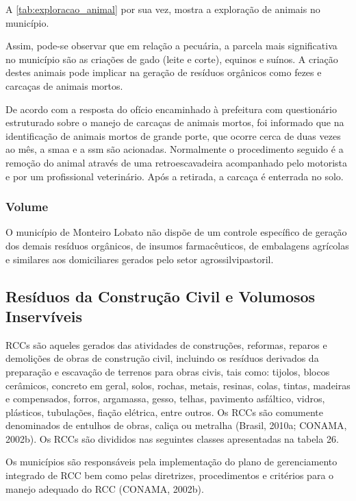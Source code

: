 	A \autoref{tab:exploracao_animal} por sua vez, mostra a exploração de animais no município.
	
	
	
	Assim, pode-se observar que em relação a pecuária, a parcela mais significativa no município são as criações de gado (leite e corte), equinos e suínos. A criação destes animais pode implicar na geração de resíduos orgânicos como fezes e carcaças de animais mortos.
	
	De acordo com a resposta do ofício encaminhado à prefeitura com questionário estruturado sobre o manejo de carcaças de animais mortos, foi informado que na identificação de animais mortos de grande porte, que ocorre cerca de duas vezes ao mês, a \gls{smaa} e a \gls{ssm} são acionadas. Normalmente o procedimento seguido é a remoção do animal através de uma retroescavadeira acompanhado pelo motorista e por um profissional veterinário. Após a retirada, a carcaça é enterrada no solo.
	
	\subsubsection{Volume}
	O município de Monteiro Lobato não dispõe de um controle específico de geração dos demais resíduos orgânicos, de insumos farmacêuticos, de embalagens agrícolas e similares aos domiciliares gerados pelo setor agrossilvipastoril.
	
	\subsection{Resíduos da Construção Civil e Volumosos Inservíveis}
	RCCs são aqueles gerados das atividades de construções, reformas, reparos e demolições de obras de construção civil, incluindo os resíduos derivados da preparação e escavação de terrenos para obras civis, tais como: tijolos, blocos cerâmicos, concreto em geral, solos, rochas, metais, resinas, colas, tintas, madeiras e compensados, forros, argamassa, gesso, telhas, pavimento asfáltico, vidros, plásticos, tubulações, fiação elétrica, entre outros. Os RCCs são comumente denominados de entulhos de obras, caliça ou metralha (Brasil, 2010a; CONAMA, 2002b). Os RCCs são divididos nas seguintes classes apresentadas na tabela 26.
	
	
	
	Os municípios são responsáveis pela implementação do plano de gerenciamento integrado de RCC bem como pelas diretrizes, procedimentos e critérios para o manejo adequado do RCC (CONAMA, 2002b). 
	
